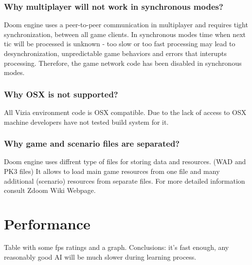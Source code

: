 \subsubsection{Why multiplayer will not work in synchronous modes?}

Doom engine uses a peer-to-peer communication in multiplayer and requires tight synchronization, between all game clients.
In synchronous modes time when next tic will be processed is unknown - too slow or too fast processing may lead to desynchronization, unpredictable game behaviors and errors that interupts processing. Therefore, the game network code has been disabled in synchronous modes.

\subsubsection{Why OSX is not supported?}

All Vizia environment code is OSX compatible. Due to the lack of access to OSX machine developers have not tested build system for it.

\subsubsection{Why game and scenario files are separated?}

Doom engine uses diffrent type of files for storing data and resources. (WAD and PK3 files) It allows to load main game resources from one file and many additional (scenario) resources from separate files. For more detailed information consult Zdoom Wiki Webpage\cite{zdoom-wiki}.

\section{Performance}\label{sec:performance}
Table with some fps ratings and a graph.
Conclusions: it's fast enough, any reasonably good AI will be much slower during learning process.



